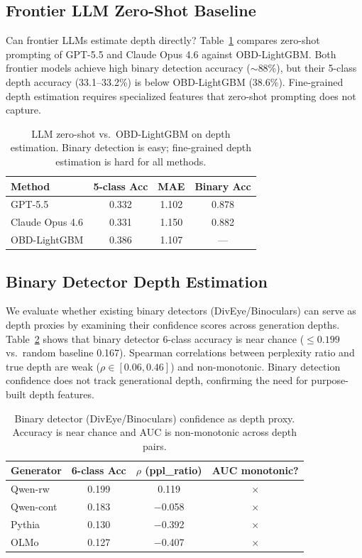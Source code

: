 \documentclass[11pt]{article}
\begin{document}
\subsection{Frontier LLM Zero-Shot Baseline}

Can frontier LLMs estimate depth directly? Table~\ref{tab:llm_baseline} compares zero-shot prompting of GPT-5.5 and Claude Opus 4.6 against OBD-LightGBM. Both frontier models achieve high binary detection accuracy ($\sim$88\%), but their 5-class depth accuracy (33.1--33.2\%) is below OBD-LightGBM (38.6\%). Fine-grained depth estimation requires specialized features that zero-shot prompting does not capture.

\begin{table}[t]
\centering
\caption{LLM zero-shot vs.\ OBD-LightGBM on depth estimation. Binary detection is easy; fine-grained depth estimation is hard for all methods.}
\label{tab:llm_baseline}
\small
\begin{tabular}{lccc}
\toprule
Method & 5-class Acc & MAE & Binary Acc \\
\midrule
GPT-5.5 & 0.332 & 1.102 & 0.878 \\
Claude Opus 4.6 & 0.331 & 1.150 & 0.882 \\
OBD-LightGBM & 0.386 & 1.107 & --- \\
\bottomrule
\end{tabular}
\end{table}

\subsection{Binary Detector Depth Estimation}
\label{sec:binary_detector}

We evaluate whether existing binary detectors (DivEye/Binoculars) can serve as depth proxies by examining their confidence scores across generation depths. Table~\ref{tab:binary_detector} shows that binary detector 6-class accuracy is near chance ($\leq 0.199$ vs.\ random baseline 0.167). Spearman correlations between perplexity ratio and true depth are weak ($\rho \in [0.06, 0.46]$) and non-monotonic. Binary detection confidence does not track generational depth, confirming the need for purpose-built depth features.

\begin{table}[t]
\centering
\caption{Binary detector (DivEye/Binoculars) confidence as depth proxy. Accuracy is near chance and AUC is non-monotonic across depth pairs.}
\label{tab:binary_detector}
\small
\begin{tabular}{lccc}
\toprule
Generator & 6-class Acc & $\rho$ (ppl\_ratio) & AUC monotonic? \\
\midrule
Qwen-rw & 0.199 & 0.119 & $\times$ \\
Qwen-cont & 0.183 & $-$0.058 & $\times$ \\
Pythia & 0.130 & $-$0.392 & $\times$ \\
OLMo & 0.127 & $-$0.407 & $\times$ \\
\bottomrule
\end{tabular}
\end{table}
\end{document}
